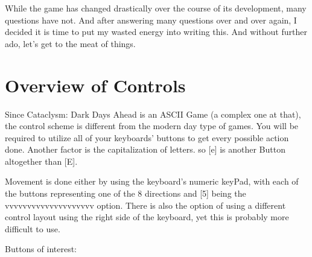 \documentclass[11pt]{report}
\begin{document}
While the game has changed drastically over the course of its development, many questions have not. And after answering many questions over and over again, I decided it is time to put my wasted energy into writing this. And without further ado, let's get to the meat of things.

 
\chapter{Overview of Controls}
 
Since Cataclysm: Dark Days Ahead is an ASCII Game (a complex one at that), the control scheme is different from the modern day type of games. You will be required to utilize all of your keyboards' buttons to get every possible action done. Another factor is the capitalization of letters. so [e] is another Button altogether than [E].
 
Movement is done either by using the keyboard's numeric keyPad, with each of the buttons representing one of the 8 directions and [5] being the vvvvvvvvvvvvvvvvvvvv option. There is also the option of using a different control layout using the right side of the keyboard, yet this is probably more difficult to use.


Buttons of interest:
\end{document}
